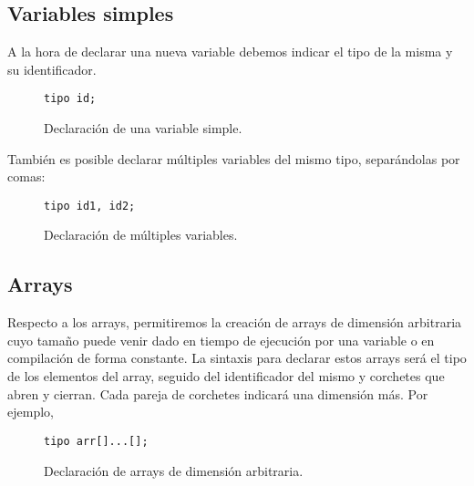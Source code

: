 \subsection*{Variables simples}
A la hora de declarar una nueva variable debemos indicar el tipo de la misma y
su identificador.
\begin{figure}[H]
    \centering
    \begin{lstlisting}
tipo id;
    \end{lstlisting}
    \caption{Declaración de una variable simple.}
\end{figure}
También es posible declarar múltiples variables del mismo tipo, separándolas por
comas:
\begin{figure}[H]
    \centering
    \begin{lstlisting}
tipo id1, id2;
    \end{lstlisting}
    \caption{Declaración de múltiples variables.}
\end{figure}


\subsection*{Arrays}
Respecto a los arrays, permitiremos la creación de arrays de dimensión
arbitraria cuyo tamaño puede venir dado en tiempo de ejecución por una variable
o en compilación de forma constante. La sintaxis para declarar estos arrays será
el tipo de los elementos del array, seguido del identificador del mismo y
corchetes que abren y cierran. Cada pareja de corchetes indicará una dimensión
más. Por ejemplo,
\begin{figure}[H]
    \centering
    \begin{lstlisting}
tipo arr[]...[];
    \end{lstlisting}
    \caption{Declaración de arrays de dimensión arbitraria.}
\end{figure}

